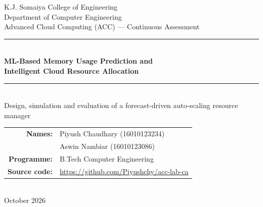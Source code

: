 \documentclass[11pt,a4paper]{article}
\begin{document}
\begin{titlepage}
\centering
\vspace*{1.5cm}
{\large K.J. Somaiya College of Engineering\\[2pt] Department of Computer Engineering}\\[1.2cm]
{\large Advanced Cloud Computing (ACC) --- Continuous Assessment}\\[1.5cm]
\rule{\linewidth}{1.2pt}\\[0.5cm]
{\LARGE\bfseries ML-Based Memory Usage Prediction and\\[4pt] Intelligent Cloud Resource Allocation}\\[0.5cm]
\rule{\linewidth}{1.2pt}\\[1.5cm]
{\large Design, simulation and evaluation of a forecast-driven auto-scaling resource manager}\\[2.5cm]
\begin{tabular}{rl}
\textbf{Names:} & Piyush Chaudhary (16010123234)\\
& Aswin Nambiar (16010123086)\\
\textbf{Programme:} & B.Tech Computer Engineering\\
\textbf{Source code:} & \url{https://github.com/Piyushchy/acc-lab-ca}\\
\end{tabular}\\[2cm]
{\large October 2026}
\vfill
\end{titlepage}
\end{document}
